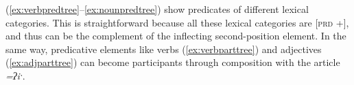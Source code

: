 


(\ref{ex:verbpredtree}--\ref{ex:nounpredtree}) show predicates of different lexical categories. This is straightforward because all these lexical categories are [\textsc{prd} +], and thus can be the complement of the inflecting second-position element. In the same way, predicative elements like verbs (\ref{ex:verbparttree}) and adjectives (\ref{ex:adjparttree}) can become participants through composition with the article \textit{=ʔiˑ}.

